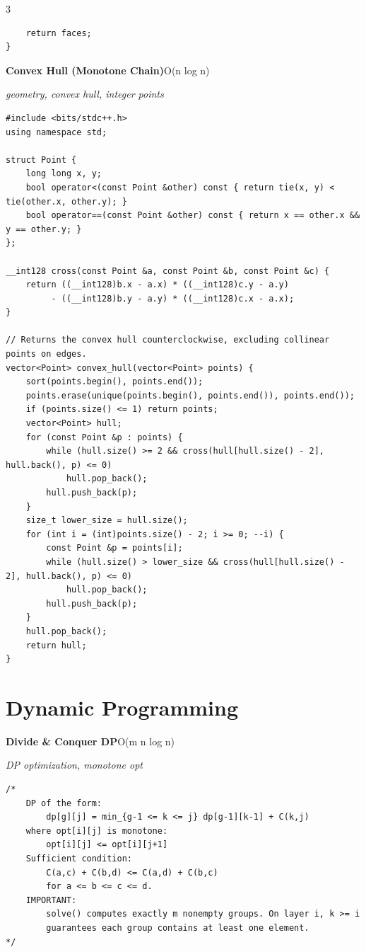 \documentclass[8pt,a4paper,landscape]{article}
\begin{document}
\begin{multicols}{3}
\begin{lstlisting}
    return faces;
}
\end{lstlisting}
\vspace{1pt}
\textbf{Convex Hull (Monotone Chain)}\hfill{\scriptsize O(n log n)}\par
{\scriptsize\itshape geometry, convex hull, integer points}\par
\begin{lstlisting}
#include <bits/stdc++.h>
using namespace std;

struct Point {
    long long x, y;
    bool operator<(const Point &other) const { return tie(x, y) < tie(other.x, other.y); }
    bool operator==(const Point &other) const { return x == other.x && y == other.y; }
};

__int128 cross(const Point &a, const Point &b, const Point &c) {
    return ((__int128)b.x - a.x) * ((__int128)c.y - a.y)
         - ((__int128)b.y - a.y) * ((__int128)c.x - a.x);
}

// Returns the convex hull counterclockwise, excluding collinear points on edges.
vector<Point> convex_hull(vector<Point> points) {
    sort(points.begin(), points.end());
    points.erase(unique(points.begin(), points.end()), points.end());
    if (points.size() <= 1) return points;
    vector<Point> hull;
    for (const Point &p : points) {
        while (hull.size() >= 2 && cross(hull[hull.size() - 2], hull.back(), p) <= 0)
            hull.pop_back();
        hull.push_back(p);
    }
    size_t lower_size = hull.size();
    for (int i = (int)points.size() - 2; i >= 0; --i) {
        const Point &p = points[i];
        while (hull.size() > lower_size && cross(hull[hull.size() - 2], hull.back(), p) <= 0)
            hull.pop_back();
        hull.push_back(p);
    }
    hull.pop_back();
    return hull;
}
\end{lstlisting}
\vspace{1pt}
\section*{Dynamic Programming}
\textbf{Divide \& Conquer DP}\hfill{\scriptsize O(m n log n)}\par
{\scriptsize\itshape DP optimization, monotone opt}\par
\begin{lstlisting}
/*
    DP of the form:
        dp[g][j] = min_{g-1 <= k <= j} dp[g-1][k-1] + C(k,j)
    where opt[i][j] is monotone:
        opt[i][j] <= opt[i][j+1]
    Sufficient condition:
        C(a,c) + C(b,d) <= C(a,d) + C(b,c)
        for a <= b <= c <= d.
    IMPORTANT:
        solve() computes exactly m nonempty groups. On layer i, k >= i
        guarantees each group contains at least one element.
*/


\end{lstlisting}
\end{multicols}
\end{document}
